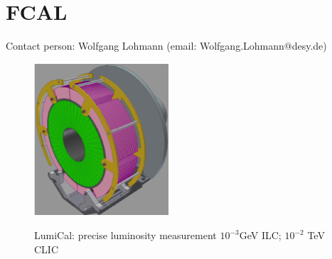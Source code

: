 \section{FCAL}
Contact person: Wolfgang Lohmann (email: Wolfgang.Lohmann@desy.de)
\begin{figure}
\begin{minipage}{\linewidth}
    \begin{minipage}{.25\linewidth}
\includegraphics[width=\textwidth]{Calorimeter/FCAL/LumiCalPic.png}
    \end{minipage}
        \begin{minipage}{.24\linewidth}
            LumiCal: precise luminosity measurement $10^{-3}$\@ \unit[500]{GeV} ILC; $10^{-2}$ \@ \unit[3]{TeV} CLIC
        \end{minipage}
    \begin{minipage}{.25\linewidth}

\end{minipage}
\end{minipage}
\end{figure}
